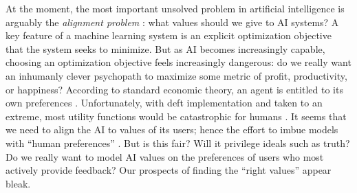 At the moment, the most important unsolved problem in
    artificial intelligence is arguably the \emph{alignment problem}
\citep{wiener-alignment1960,alignment-zhuang-2020-NeurIPS,christian2020alignment}:
what values should we give to AI systems? 
A key feature of a machine learning system is an explicit optimization objective that the system seeks to minimize. 
But as AI becomes increasingly capable, choosing an optimization objective 
    feels increasingly dangerous:
do we really want
an inhumanly clever psychopath to maximize some metric of profit, productivity, or happiness? 
According to standard economic theory, an agent is entitled to its own preferences
    .
Unfortunately, with deft implementation and taken to an extreme, most 
    utility functions would be catastrophic for humans \citep{bostrom-superintelligence}. 
It seems that we need to align the AI to values of its users;
    hence the effort to imbue models with 
    ``human preferences'' \citep{christiano2017deep}.
%
But is this fair?
Will it privilege ideals such as truth?
Do we really want to model AI values on the preferences of users who most actively provide feedback?
Our prospects of finding the ``right values'' appear bleak.


